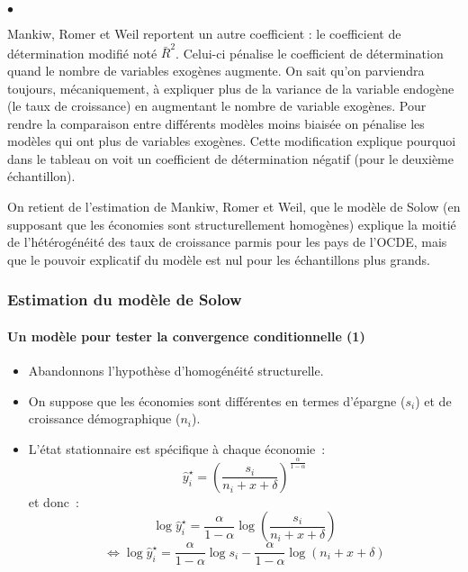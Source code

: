 \documentclass[10pt,notheorems]{beamer}
\theoremstyle{plain}
\theoremstyle{definition} %
\begin{document}
\begin{notes}
\begin{list}{$\bullet$}{}
  \item Mankiw, Romer et Weil reportent un autre coefficient : le coefficient de
    détermination modifié noté $\bar R^ 2$. Celui-ci pénalise le coefficient de
    détermination quand le nombre de variables exogènes augmente. On sait qu'on
    parviendra toujours, mécaniquement, à expliquer plus de la variance de la
    variable endogène (le taux de croissance) en augmentant le nombre de
    variable exogènes. Pour rendre la comparaison entre différents modèles moins
    biaisée on pénalise les modèles qui ont plus de variables exogènes. Cette
    modification explique pourquoi dans le tableau on voit un coefficient de
    détermination négatif (pour le deuxième échantillon).\newline

  \item On retient de l'estimation de Mankiw, Romer et Weil, que le modèle de
    Solow (en supposant que les économies sont structurellement homogènes)
    explique la moitié de l'hétérogénéité des taux de croissance parmis pour les
    pays de l'OCDE, mais que le pouvoir explicatif du modèle est nul pour les
    échantillons plus grands.
  \end{list}

\end{notes}


\begin{frame}
  \frametitle{Estimation du modèle de Solow}
  \framesubtitle{Un modèle pour tester la convergence conditionnelle (1)}

  \begin{itemize}

  \item Abandonnons l'hypothèse d'homogénéité structurelle.\newline

  \item On suppose que les économies sont différentes en termes d'épargne ($s_i$) et de croissance démographique ($n_i$).\newline

  \item L'état stationnaire est spécifique à chaque économie~:
    \[
      \hat y_i^{\star} = \left(\frac{s_i}{n_i+x+\delta}\right)^{\frac{\alpha}{1-\alpha}}
    \]
    et donc~:
    \[
      \log \hat y_i^{\star} = \frac{\alpha}{1-\alpha}\log \left(\frac{s_i}{n_i+x+\delta}\right)
    \]
    \[
      \Leftrightarrow \log \hat y_i^{\star} = \frac{\alpha}{1-\alpha}\log s_i - \frac{\alpha}{1-\alpha}\log(n_i+x+\delta)
    \]


  \end{itemize}

\end{frame}
\end{document}
